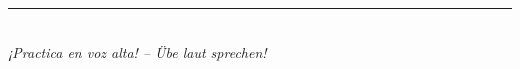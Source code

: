 \documentclass[10pt, a4paper]{article}
\begin{document}
\vspace{8pt}


\begin{center}
\rule{0.8\textwidth}{0.4pt}\\[4pt]
{\small\textit{¡Practica en voz alta! -- Übe laut sprechen!}}
\end{center}
\end{document}
